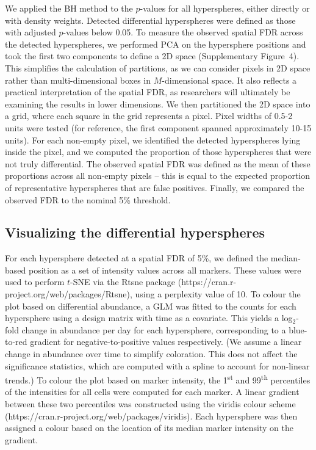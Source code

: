 \documentclass{article}
\newcommand{\suppfigfdr}{4}
\begin{document}
We applied the BH method to the $p$-values for all hyperspheres, either directly or with density weights.
Detected differential hyperspheres were defined as those with adjusted $p$-values below 0.05.
To measure the observed spatial FDR across the detected hyperspheres, we performed PCA on the hypersphere positions and took the first two components to define a 2D space (Supplementary Figure~\suppfigfdr{}).
This simplifies the calculation of partitions, as we can consider pixels in 2D space rather than multi-dimensional boxes in $M$-dimensional space.
It also reflects a practical interpretation of the spatial FDR, as researchers will ultimately be examining the results in lower dimensions.
We then partitioned the 2D space into a grid, where each square in the grid represents a pixel.
Pixel widths of 0.5-2 units were tested (for reference, the first component spanned approximately 10-15 units).
For each non-empty pixel, we identified the detected hyperspheres lying inside the pixel, and we computed the proportion of those hyperspheres that were not truly differential.
The observed spatial FDR was defined as the mean of these proportions across all non-empty pixels --
this is equal to the expected proportion of representative hyperspheres that are false positives.
Finally, we compared the observed FDR to the nominal 5\% threshold.

\subsection{Visualizing the differential hyperspheres}
For each hypersphere detected at a spatial FDR of 5\%, we defined the median-based position as a set of intensity values across all markers.
These values were used to perform $t$-SNE via the Rtsne package (https://cran.r-project.org/web/packages/Rtsne), using a perplexity value of 10.
To colour the plot based on differential abundance, a GLM was fitted to the counts for each hypersphere using a design matrix with time as a covariate.
This yields a log$_2$-fold change in abundance per day for each hypersphere, corresponding to a blue-to-red gradient for negative-to-positive values respectively.
(We assume a linear change in abundance over time to simplify coloration.
This does not affect the significance statistics, which are computed with a spline to account for non-linear trends.)
To colour the plot based on marker intensity, the 1\textsuperscript{st} and 99\textsuperscript{th} percentiles of the intensities for all cells were computed for each marker.
A linear gradient between these two percentiles was constructed using the viridis colour scheme (https://cran.r-project.org/web/packages/viridis).
Each hypersphere was then assigned a colour based on the location of its median marker intensity on the gradient. 
\end{document}

